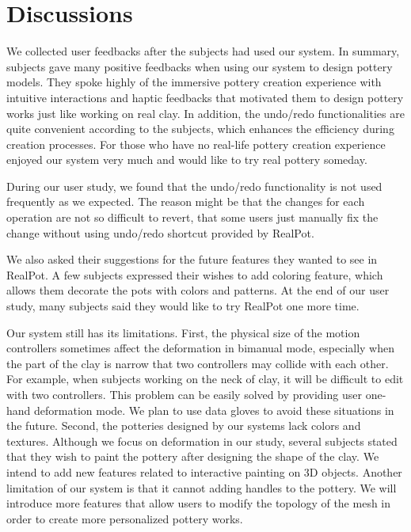\documentclass{svjour3}                     %
\begin{document}
\section{Discussions}
\label{sec:7}
We collected user feedbacks after the subjects had used our system. In summary, subjects gave many positive feedbacks when using our system to design pottery models. They spoke highly of the immersive pottery creation experience with intuitive interactions and haptic feedbacks that motivated them to design pottery works just like working on real clay. In addition, the undo/redo functionalities are quite convenient according to the subjects, which enhances the efficiency during creation processes. For those who have no real-life pottery creation experience enjoyed our system very much and would like to try real pottery someday. 

During our user study, we found that the undo/redo functionality is not used frequently as we expected.
The reason might be that the changes for each operation are not so difficult to revert, that some users just manually fix the change without using undo/redo shortcut provided by RealPot.

We also asked their suggestions for the future features they wanted to see in RealPot.
A few subjects expressed their wishes to add coloring feature, which allows them decorate the pots with colors and patterns.
At the end of our user study, many subjects said they would like to try RealPot one more time.

Our system still has its limitations. First, the physical size of the motion controllers sometimes affect the deformation in bimanual mode, especially when the part of the clay is narrow that two controllers may collide with each other. For example, when subjects working on the neck of clay, it will be difficult to edit with two controllers. This problem can be easily solved by providing user one-hand deformation mode. We plan to use data gloves to avoid these situations in the future.
%
Second, the potteries designed by our systems lack colors and textures. Although we focus on deformation in our study, several subjects stated that they wish to paint the pottery after designing the shape of the clay. We intend to add new features related to interactive painting on 3D objects.
%
Another limitation of our system is that it cannot adding handles to the pottery. We will introduce more features that allow users to modify the topology of the mesh in order to create more personalized pottery works.
\end{document}
